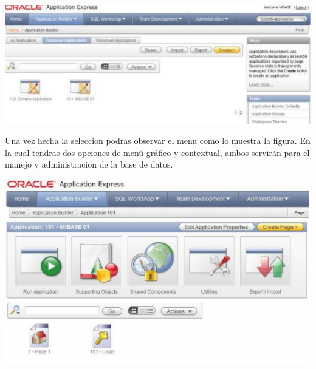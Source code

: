 \documentclass[12pt,letterpaper]{article}
\begin{document}
\begin{center}
\includegraphics[width=15cm]{./IMG/img14}
\end{center}
Una vez hecha la seleccion podras observar el menu como lo muestra la figura. En la cual tendras dos opciones de men\'u gr\'afico y contextual, ambos servir\'an
para el manejo y administracion de la base de datos.
\begin{center}
\includegraphics[width=15cm]{./IMG/img15}
\end{center}
\end{document}
